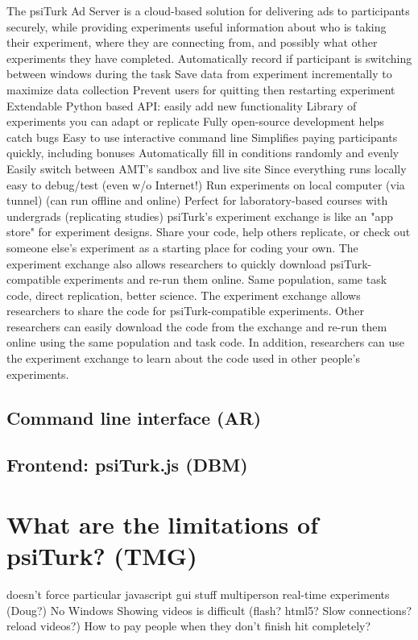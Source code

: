 \documentclass[jou,apacite]{apa6}
\begin{document}
The psiTurk Ad Server is a cloud-based solution for delivering ads to participants securely, while providing experiments useful information about who is taking their experiment, where they are connecting from, and possibly what other experiments they have completed.
Automatically record if participant is switching between windows during the task
Save data from experiment incrementally to maximize data collection
Prevent users for quitting then restarting experiment
Extendable Python based API: easily add new functionality
Library of experiments you can adapt or replicate
Fully open-source development helps catch bugs
Easy to use interactive command line
Simplifies paying participants quickly, including bonuses
Automatically fill in conditions randomly and evenly
Easily switch between AMT's sandbox and live site
Since everything runs locally easy to debug/test (even w/o Internet!)
Run experiments on local computer (via tunnel) (can run offline and online)
Perfect for laboratory-based courses with undergrads (replicating studies)
psiTurk's experiment exchange is like an "app store" for experiment designs. Share your code, help others replicate, or check out someone else's experiment as a starting place for coding your own. The experiment exchange also allows researchers to quickly download psiTurk-compatible experiments and re-run them online. Same population, same task code, direct replication, better science.
The experiment exchange allows researchers to share the code for psiTurk-compatible experiments. Other researchers can easily download the code from the exchange and re-run them online using the same population and task code. In addition, researchers can use the experiment exchange to learn about the code used in other people's experiments. 




\subsection{Command line interface (AR)}


\subsection{Frontend: psiTurk.js (DBM)}


\section{What are the limitations of psiTurk? (TMG)}
doesn't force particular javascript gui stuff
multiperson real-time experiments (Doug?) 
No Windows
Showing videos is difficult (flash? html5? Slow connections? reload videos?)
How to pay people when they don't finish hit completely?
\end{document}

